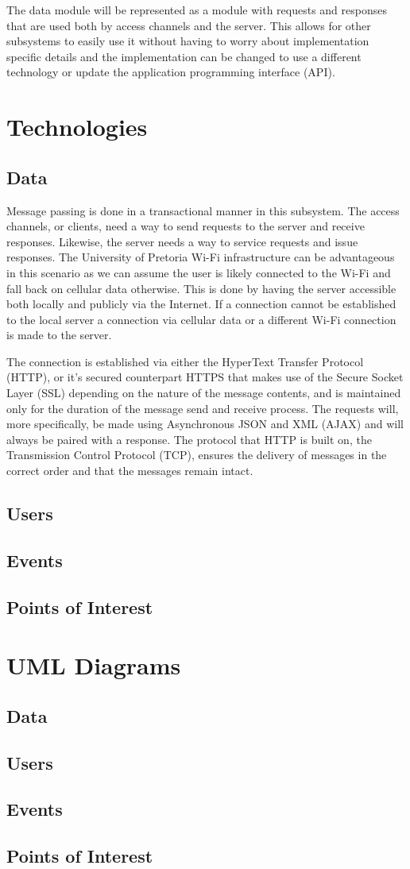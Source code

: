 \documentclass[11pt]{article}
\begin{document}
	The data module will be represented as a module with requests and responses that are used both by access channels and the server. This allows for other subsystems to easily use it without having to worry about implementation specific details and the implementation can be changed to use a different technology or update the application programming interface (API).
	
	\section{Technologies}
	\subsection{Data}
	Message passing is done in a transactional manner in this subsystem. The access channels, or clients, need a way to send requests to the server and receive responses. Likewise, the server needs a way to service requests and issue responses. The University of Pretoria Wi-Fi infrastructure can be advantageous in this scenario as we can assume the user is likely connected to the Wi-Fi and fall back on cellular data otherwise. This is done by having the server accessible both locally and publicly via the Internet. If a connection cannot be established to the local server a connection via cellular data or a different Wi-Fi connection is made to the server.
	
	The connection is established via either the HyperText Transfer Protocol (HTTP), or it's secured counterpart HTTPS that makes use of the Secure Socket Layer (SSL) depending on the nature of the message contents, and is maintained only for the duration of the message send and receive process. The requests will, more specifically, be made using Asynchronous JSON and XML (AJAX) and will always be paired with a response. The protocol that HTTP is built on, the Transmission Control Protocol (TCP), ensures the delivery of messages in the correct order and that the messages remain intact.
	\subsection{Users}
	\subsection{Events}
	\subsection{Points of Interest}
	
	\section{UML Diagrams}
	\subsection{Data}
	\subsection{Users}
	\subsection{Events}
	\subsection{Points of Interest}
\end{document}
